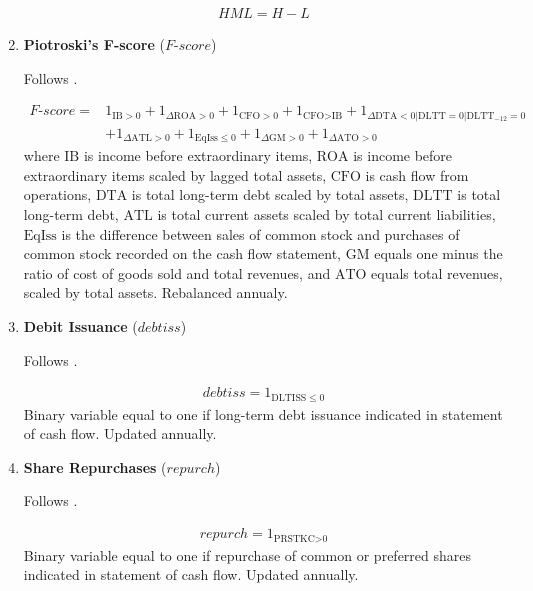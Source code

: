 \begin{enumerate}
	\begin{align*}
		HML = H - L
	\end{align*}
	
	
	
	\item \textbf{Piotroski's F-score} ($F$-$score$)
	
	Follows . 
	
	\begin{align*}
		F\text{-}score = & 1_{\text{IB}>0} + 1_{\Delta \text{ROA}>0} + 1_{\text{CFO}>0} + 1_{\text{CFO}>\text{IB}} + 1_{\Delta \text{DTA}<0 | \text{DLTT}=0 | \text{DLTT}_{-12}=0} \\
		& + 1_{\Delta \text{ATL}>0} + 1_{\text{EqIss} \leq 0} + 1_{\Delta \text{GM}>0} + 1_{\Delta \text{ATO}>0}
	\end{align*}
	where $\mathrm{IB}$ is income before extraordinary items, $\mathrm{ROA}$ is income before extraordinary items scaled by lagged total assets, $\mathrm{CFO}$ is cash flow from operations, $\mathrm{DTA}$ is total long-term debt scaled by total assets, $\mathrm{DLTT}$ is total long-term debt, $\mathrm{ATL}$ is total current assets scaled by total current liabilities, $\mathrm{EqIss}$ is the difference between sales of common stock and purchases of common stock recorded on the cash flow statement, $\mathrm{GM}$ equals one minus the ratio of cost of goods sold and total revenues, and $\mathrm{ATO}$ equals total revenues, scaled by total assets. Rebalanced annualy.
	
	
	
	\item \textbf{Debit Issuance} ($debtiss$)
	
	Follows . 
	
	\begin{align*}
		debtiss = 1_{\text{DLTISS} \leq 0}
	\end{align*}
	Binary variable equal to one if long-term debt issuance indicated in statement of cash flow. Updated annually.
	
	
	
	\item \textbf{Share Repurchases} ($repurch$)
	
	Follows . 
	
	\begin{align*}
		repurch = 1_{\text{PRSTKC>0}}
	\end{align*}
	Binary variable equal to one if repurchase of common or preferred shares indicated in statement of cash flow. Updated annually.
	

\end{enumerate}
